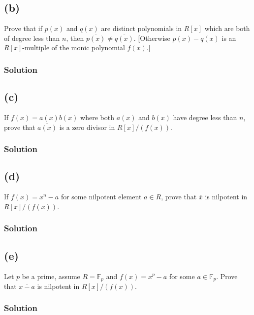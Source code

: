 \documentclass[fleqn]{article}
\begin{document}
        
        \subsection{(b)}
        Prove that if $p(x)$ and $q(x)$ are distinct polynomials in $R[x]$ which are both of degree less than $n$, then $\overline{p(x)} \neq \overline{q(x)}$.  [Otherwise $p(x) - q(x)$ is an $R[x]$-multiple of the monic polynomial $f(x)$.]
            
            \subsubsection{Solution}
            
        
        \subsection{(c)}
        If $f(x) = a(x) b(x)$ where both $a(x)$ and $b(x)$ have degree less than $n$, prove that $\overline{a(x)}$ is a zero divisor in $R[x]/(f(x))$.
            
            \subsubsection{Solution}
            
        
        \subsection{(d)}
        If $f(x) = x^n - a$ for some nilpotent element $a \in R$, prove that $\overline{x}$ is nilpotent in $R[x]/(f(x))$.
            
            \subsubsection{Solution}
            
        
        \subsection{(e)}
        Let $p$ be a prime, assume $R = \mathbb{F}_p$ and $f(x) = x^p - a$ for some $a \in \mathbb{F}_p$.  Prove that $\overline{x - a}$ is nilpotent in $R[x]/(f(x))$.
            
            \subsubsection{Solution}
            
\end{document}
